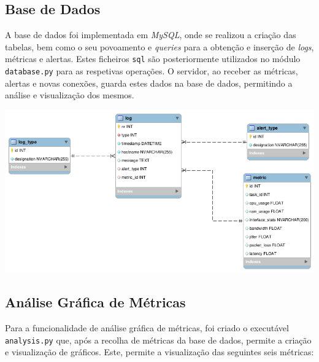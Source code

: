 \documentclass[a4paper,12pt]{scrreprt}
\begin{document}
\subsection{Base de Dados}

A base de dados foi implementada em \textit{MySQL}, onde se realizou a criação das tabelas,
bem como o seu povoamento e \textit{queries} para a obtenção e inserção de \textit{logs},
métricas e alertas. Estes ficheiros \texttt{sql} são posteriormente utilizados no módulo
\texttt{database.py} para as respetivas operações. O servidor, ao receber as métricas, alertas
e novas conexões, guarda estes dados na base de dados, permitindo a análise e visualização
dos mesmos.

\begin{minipage}{\textwidth}
    \centering
    \includegraphics[width=\textwidth]{img/db.png}
    \label{fig:database}
\end{minipage}

\clearpage

\subsection{Análise Gráfica de Métricas}

Para a funcionalidade de análise gráfica de métricas, foi criado o executável
\texttt{analysis.py} que, após a recolha de métricas da base de dados, permite
a criação e visualização de gráficos. Este, permite a visualização das seguintes
seis métricas:
\end{document}
